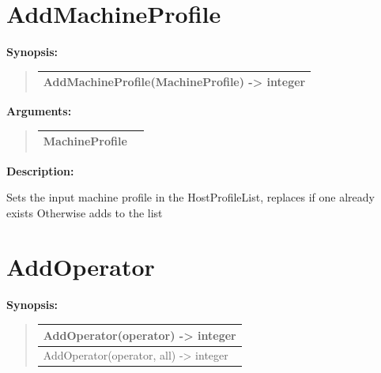 \documentclass[letterpaper,10pt,english]{sphinxmanual}
\begin{document}
\section{AddMachineProfile}
\label{functions:addmachineprofile}
\begin{DUlineblock}{0em}
\item[] \textbf{Synopsis:}
\end{DUlineblock}
\begin{quote}

\begin{tabulary}{\linewidth}{|L|}
\hline

AddMachineProfile(MachineProfile) -\textgreater{} integer
\\
\hline\end{tabulary}

\end{quote}

\begin{DUlineblock}{0em}
\item[] 
\item[] \textbf{Arguments:}
\end{DUlineblock}
\begin{quote}

\begin{tabulary}{\linewidth}{|L|L|}
\hline

MachineProfile
 & \\
\hline\end{tabulary}

\end{quote}

\begin{DUlineblock}{0em}
\item[] 
\item[] \textbf{Description:}
\item[] Sets the input machine profile in the HostProfileList, replaces if one already exists
Otherwise adds to the list
\end{DUlineblock}

\begin{DUlineblock}{0em}
\item[] 
\end{DUlineblock}


\section{AddOperator}
\label{functions:addoperator}
\begin{DUlineblock}{0em}
\item[] \textbf{Synopsis:}
\end{DUlineblock}
\begin{quote}

\begin{tabulary}{\linewidth}{|L|}
\hline

AddOperator(operator) -\textgreater{} integer
\\
\hline
AddOperator(operator, all) -\textgreater{} integer
\\
\hline\end{tabulary}

\end{quote}
\end{document}
